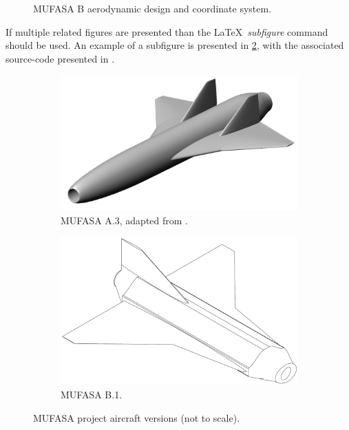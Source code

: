 \begin{figure}[hbt!]
	\centering
	\captionsetup{width=0.7\textwidth}
	\def\svgwidth{0.7\textwidth}
	
	\caption{MUFASA B aerodynamic design and coordinate system.}
	\label{fig:mufasaB2}
	\hfill
\end{figure}



If multiple related figures are presented than the \LaTeX\ \textit{subfigure} command should be used. 
An example of a subfigure is presented in \cref{fig:aircraftComparison}, with the associated source-code presented in . 

\begin{figure}[hbt!]
	\centering
	\begin{subfigure}{0.48\textwidth}
		\centering
		\captionsetup{width=0.95\linewidth}
		\includegraphics[width=0.95\linewidth]{Photos/Aircraft/MUFASA_Gair}
		\caption{MUFASA A.3, adapted from \citeauthor{ShaunThesis} \cite{ShaunThesis}.}
	\end{subfigure}
	\begin{subfigure}{0.48\textwidth}
		\centering
		\captionsetup{width=0.95\linewidth}
		\includegraphics[width=0.95\linewidth]{Photos/Aircraft/MUFASA_ISO}
		\caption{MUFASA B.1.}
	\end{subfigure}
	\caption{MUFASA project aircraft versions (not to scale). \label{fig:aircraftComparison}}
\end{figure}

